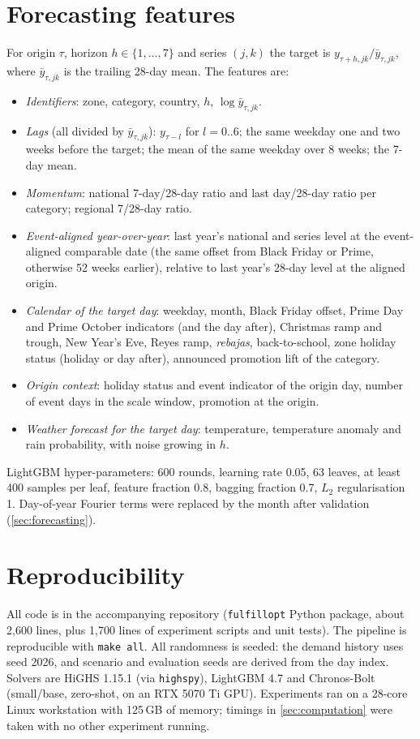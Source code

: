 \section{Forecasting features}\label{app:features}
For origin $\tau$, horizon $h\in\{1,\dots,7\}$ and series $(j,k)$ the target is $y_{\tau+h,jk}/\bar y_{\tau,jk}$, where $\bar y_{\tau,jk}$ is the trailing 28-day mean.
The features are:
\begin{itemize}
  \item \emph{Identifiers}: zone, category, country, $h$, $\log\bar y_{\tau,jk}$.
  \item \emph{Lags} (all divided by $\bar y_{\tau,jk}$): $y_{\tau-l}$ for $l=0..6$; the same weekday one and two weeks before the target; the mean of the same weekday over 8 weeks; the 7-day mean.
  \item \emph{Momentum}: national 7-day/28-day ratio and last day/28-day ratio per category; regional 7/28-day ratio.
  \item \emph{Event-aligned year-over-year}: last year's national and series level at the event-aligned comparable date (the same offset from Black Friday or Prime, otherwise 52 weeks earlier), relative to last year's 28-day level at the aligned origin.
  \item \emph{Calendar of the target day}: weekday, month, Black Friday offset, Prime Day and Prime October indicators (and the day after), Christmas ramp and trough, New Year's Eve, Reyes ramp, \emph{rebajas}, back-to-school, zone holiday status (holiday or day after), announced promotion lift of the category.
  \item \emph{Origin context}: holiday status and event indicator of the origin day, number of event days in the scale window, promotion at the origin.
  \item \emph{Weather forecast for the target day}: temperature, temperature anomaly and rain probability, with noise growing in $h$.
\end{itemize}
LightGBM hyper-parameters: 600 rounds, learning rate 0.05, 63 leaves, at least 400 samples per leaf, feature fraction 0.8, bagging fraction 0.7, $L_2$ regularisation 1.
Day-of-year Fourier terms were replaced by the month after validation (\cref{sec:forecasting}).

\section{Reproducibility}\label{app:repro}
All code is in the accompanying repository (\texttt{fulfillopt} Python package, about 2,600 lines, plus 1,700 lines of experiment scripts and unit tests).
The pipeline is reproducible with \texttt{make all}.
All randomness is seeded: the demand history uses seed 2026, and scenario and evaluation seeds are derived from the day index.
Solvers are HiGHS 1.15.1 (via \texttt{highspy}), LightGBM 4.7 and Chronos-Bolt (small/base, zero-shot, on an RTX 5070 Ti GPU).
Experiments ran on a 28-core Linux workstation with 125\,GB of memory; timings in \cref{sec:computation} were taken with no other experiment running.

